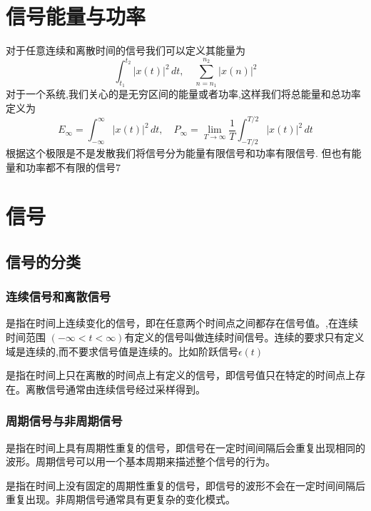 \section{信号能量与功率}
对于任意连续和离散时间的信号我们可以定义其能量为
\[
\int_{t_1}^{t_2}|x(t)|^2\,dt,\quad
\sum_{n=n_1}^{n_2}|x(n)|^2
\]
对于一个系统,我们关心的是无穷区间的能量或者功率,这样我们将总能量和总功率定义为
\[
E_\infty=\int_{-\infty}^{\infty}|x(t)|^2\,dt,\quad
P_\infty=\lim_{T\to\infty}\frac{1}{T}\int_{-T/2}^{T/2}|x(t)|^2\,dt
\]
根据这个极限是不是发散我们将信号分为能量有限信号和功率有限信号.
但也有能量和功率都不有限的信号7
\section{信号}
\subsection{信号的分类}
\subsubsection{连续信号和离散信号}
\begin{definition}
    是指在时间上连续变化的信号，即在任意两个时间点之间都存在信号值。,在连续时间范围
    $(-\infty < t < \infty)$有定义的信号叫做连续时间信号。连续的要求只有定义域是连续的,而不要求信号值是连续的。比如阶跃信号$\epsilon(t)$\\
\end{definition}
\begin{definition}
    是指在时间上只在离散的时间点上有定义的信号，即信号值只在特定的时间点上存在。离散信号通常由连续信号经过采样得到。\\
\end{definition}
\subsubsection{周期信号与非周期信号}
\begin{definition}
    是指在时间上具有周期性重复的信号，即信号在一定时间间隔后会重复出现相同的波形。周期信号可以用一个基本周期来描述整个信号的行为。\\
\end{definition}

\begin{definition}
    是指在时间上没有固定的周期性重复的信号，即信号的波形不会在一定时间间隔后重复出现。非周期信号通常具有更复杂的变化模式。\\
\end{definition}

